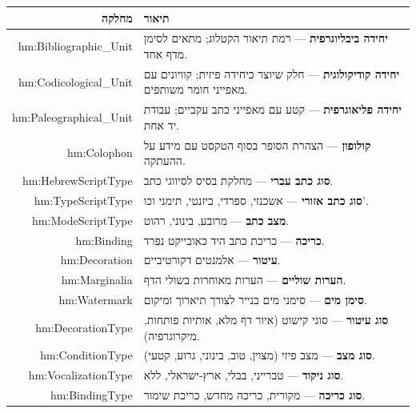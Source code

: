 \documentclass[12pt,a4paper]{article}
\begin{document}
\begin{longtable}{|r|p{10cm}|}
\hline
\textbf{מחלקה} & \textbf{תיאור} \\
\hline
\endhead

hm:Bibliographic\_Unit & 
\textbf{יחידה ביבליוגרפית} — רמת תיאור הקטלוג; מתאים לסימן מדף אחד.\\
\hline

hm:Codicological\_Unit & 
\textbf{יחידה קודיקולוגית} — חלק שיוצר כיחידה פיזית; קוויונים עם מאפייני חומר משותפים.\\
\hline

hm:Paleographical\_Unit & 
\textbf{יחידה פליאוגרפית} — קטע עם מאפייני כתב עקביים; עבודת יד אחת.\\
\hline

hm:Colophon & 
\textbf{קולופון} — הצהרת הסופר בסוף הטקסט עם מידע על ההעתקה.\\
\hline

hm:HebrewScriptType & 
\textbf{סוג כתב עברי} — מחלקת בסיס לסיווגי כתב.\\
\hline

hm:TypeScriptType & 
\textbf{סוג כתב אזורי} — אשכנזי, ספרדי, ביזנטי, תימני וכו'.\\
\hline

hm:ModeScriptType & 
\textbf{מצב כתב} — מרובע, בינוני, רהוט.\\
\hline

hm:Binding & 
\textbf{כריכה} — כריכת כתב היד כאובייקט נפרד.\\
\hline

hm:Decoration & 
\textbf{עיטור} — אלמנטים דקורטיביים.\\
\hline

hm:Marginalia & 
\textbf{הערות שוליים} — הערות מאוחרות בשולי הדף.\\
\hline

hm:Watermark & 
\textbf{סימן מים} — סימני מים בנייר לצורך תיארוך ומיקום.\\
\hline

hm:DecorationType & 
\textbf{סוג עיטור} — סוגי קישוט (איור דף מלא, אותיות פותחות, מיקרוגרפיה).\\
\hline

hm:ConditionType & 
\textbf{סוג מצב} — מצב פיזי (מצוין, טוב, בינוני, גרוע, קטעי).\\
\hline

hm:VocalizationType & 
\textbf{סוג ניקוד} — טברייני, בבלי, ארץ-ישראלי, ללא.\\
\hline

hm:BindingType & 
\textbf{סוג כריכה} — מקורית, כריכה מחדש, כריכת שימור.\\
\hline


\end{longtable}
\end{document}
